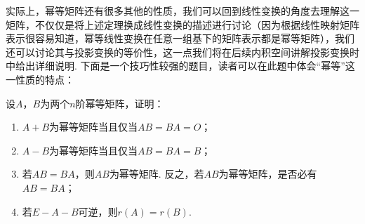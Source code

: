 实际上，幂等矩阵还有很多其他的性质，我们可以回到线性变换的角度去理解这一矩阵，不仅仅是将上述定理换成线性变换的描述进行讨论（因为根据线性映射矩阵表示很容易知道，幂等线性变换在任意一组基下的矩阵表示都是幂等矩阵），我们还可以讨论其与投影变换的等价性，这一点我们将在后续内积空间讲解投影变换时中给出详细说明. 下面是一个技巧性较强的题目，读者可以在此题中体会``幂等''这一性质的特点：
\begin{example}
    设$A$，$B$为两个$n$阶幂等矩阵，证明：
    \begin{enumerate}
        \item $A+B$为幂等矩阵当且仅当$AB=BA=O$；

        \item $A-B$为幂等矩阵当且仅当$AB=BA=B$；

        \item 若$AB=BA$，则$AB$为幂等矩阵. 反之，若$AB$为幂等矩阵，是否必有$AB=BA$；

        \item 若$E-A-B$可逆，则$r(A)=r(B)$.
    \end{enumerate}
\end{example}

